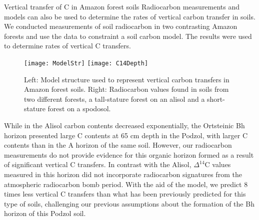 \documentclass[final,hyperref={pdfpagelabels=false}, professionalmath, mathserif, 11pt]{beamer}
\begin{document}
\begin{frame}
\begin{columns}
\begin{column}{.48\textwidth}
\begin{minipage}[T]{.95\textwidth}
\begin{block}{Vertical transfer of C in Amazon forest soils}
      Radiocarbon measurements and models can also be used to determine the rates of vertical carbon transfer in soils. We conducted measurements of soil radiocarbon in two contrasting Amazon forests and use the data to constraint a soil carbon model. The results were used to determine rates of vertical C transfers. 
	\begin{figure}
	  \texttt{[image: ModelStr]}
	  \texttt{[image: C14Depth]}
	  \caption{Left: Model structure used to represent vertical carbon transfers in Amazon forest soils. Right: Radiocarbon values found in soils from two different forests, a tall-stature forest on an alisol and a short-stature forest on a spodosol. }
	\end{figure}
	
	While in the Alisol carbon contents decreased exponentially, the Ortsteinic Bh horizon presented large C contents at 65 cm depth in the Podzol, with larger C contents than in the A horizon of the same soil. However, our radiocarbon measurements do not provide evidence for this organic horizon formed as a result of significant vertical C transfers. In contrast with the Alisol, $\Delta^{14}$C values measured in this horizon did not incorporate radiocarbon signatures from the atmospheric radiocarbon bomb period. With the aid of the model, we predict 8 times less vertical C transfers than what has been previously predicted for this type of soils, challenging our previous assumptions about the formation of the Bh horizon of this Podzol soil.
      \end{block}
    \end{minipage}
  \end{column}
\end{columns}
	\vspace{3ex}
\end{frame}
\end{document}
